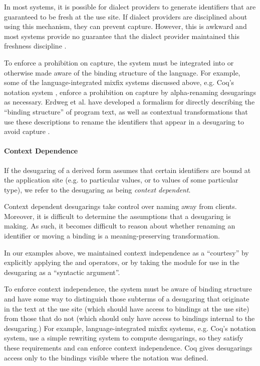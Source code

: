 {In most systems, it is possible for dialect providers to generate identifiers that are guaranteed to be fresh at the use site. If dialect providers are disciplined about using this mechanism, they can prevent capture. However, this is awkward and most systems provide no guarantee that the dialect provider maintained this freshness discipline \cite{conf/ecoop/ErdwegSD14}.

To enforce a prohibition on capture, the system must be integrated into or otherwise made aware of the binding structure of the language. For example, some of the language-integrated mixfix systems discussed above, e.g. Coq's notation system \cite{Coq:manual}, enforce a prohibition on capture by alpha-renaming desugarings as necessary. Erdweg et al. have developed a formalism for directly describing the ``binding structure'' of program text, as well as contextual transformations that use these descriptions to rename the identifiers that appear in a desugaring to avoid capture \cite{conf/ecoop/ErdwegSD14,conf/sle/RitschelE15}.

\paragraph{Context Dependence} If the desugaring of a derived form assumes that certain identifiers are bound at the application site (e.g. to particular values, or to values of some particular type), we refer to the desugaring as being \emph{context dependent}. 


Context dependent desugarings take control over naming away from clients. Moreover, it is difficult to determine the assumptions that a desugaring is making. As such, it becomes difficult to reason about whether renaming an identifier or moving a binding is a meaning-preserving transformation. 

In our examples above, we maintained context independence as a ``courtesy'' by explicitly applying the  and  operators, or by taking the module for use in the desugaring as a ``syntactic argument''. 

To enforce context independence, the system must be aware of binding structure and have some way to distinguish those subterms of a desugaring that originate in the text at the use site (which should have access to bindings at the use site) from those that do not (which should only have access to bindings internal to the desugaring.) 
For example, language-integrated mixfix systems, e.g. Coq's notation system, use a simple rewriting system to compute desugarings, so they satisfy these requirements and can enforce context independence. Coq gives desugarings access only to the bindings visible where the notation was defined.

}
